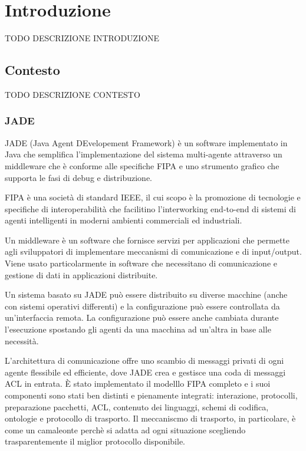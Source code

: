 \chapter{Introduzione}
\lhead[\fancyplain{}{\bfseries\thepage}]{\fancyplain{}{\bfseries\rightmark}}
TODO DESCRIZIONE INTRODUZIONE

\section{Contesto}
TODO DESCRIZIONE CONTESTO

\subsection{JADE}
JADE (Java Agent DEvelopement Framework) \`e un software implementato in Java che semplifica l'implementazione del sistema multi-agente attraverso un middleware che \`e conforme alle specifiche FIPA e uno strumento grafico che supporta le fasi di debug e distribuzione.

FIPA \`e una societ\`a di standard IEEE, il cui scopo \`e la promozione di tecnologie e specifiche di interoperabilit\`a che facilitino l'interworking end-to-end di sistemi di agenti intelligenti in moderni ambienti commerciali ed industriali.

Un middleware \`e un software che fornisce servizi per applicazioni che permette agli sviluppatori di implementare meccanismi di comunicazione e di input/output. Viene usato particolarmente in software che necessitano di comunicazione e gestione di dati in applicazioni distribuite.

Un sistema basato su JADE pu\`o essere distribuito su diverse macchine (anche con sistemi operativi differenti) e la configurazione pu\`o essere controllata da un'interfaccia remota. La configurazione pu\`o essere anche cambiata durante l'esecuzione spostando gli agenti da una macchina ad un'altra in base alle necessit\`a.


L'architettura di comunicazione offre uno scambio di messaggi privati di ogni agente  flessibile ed efficiente, dove JADE crea e gestisce una coda di messaggi ACL in entrata.
\`E stato implementato il modelllo FIPA completo e i suoi componenti sono stati ben distinti e pienamente integrati: interazione, protocolli, preparazione pacchetti, ACL, contenuto dei linguaggi, schemi di codifica, ontologie e protocollo di trasporto.
Il meccaniscmo di trasporto, in particolare, \`e come un camaleonte perch\`e si adatta ad ogni situazione scegliendo trasparentemente il miglior protocollo disponibile.

